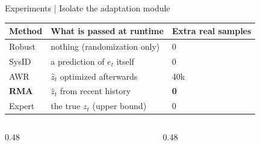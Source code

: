 \documentclass[aspectratio=169,10pt,t]{beamer}
\begin{document}
\begin{frame}{Experiments | Isolate the adaptation module}
  \centering
  {\footnotesize
  \begin{tabular}{lll}
    \toprule
    Method & What is passed at runtime & Extra real samples \\
    \midrule
    Robust & nothing (randomization only) & 0 \\
    SysID & a prediction of $e_t$ itself & 0 \\
    AWR & $\hat z_t$ optimized afterwards & 40k \\
    \textbf{RMA} & $\hat z_t$ from recent history & \textbf{0} \\
    \midrule
    Expert & the true $z_t$ (upper bound) & 0 \\
    \bottomrule
  \end{tabular}}

  \vspace{0.7em}
  \raggedright
  \begin{columns}[T,onlytextwidth]
    \begin{column}{0.48\textwidth}
    \end{column}
    \hfill
    \begin{column}{0.48\textwidth}
    \end{column}
  \end{columns}

\end{frame}
\end{document}
